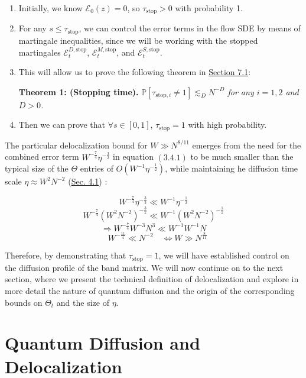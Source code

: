 \documentclass[11pt]{article}
\newenvironment{boxtheorem}[1]
  {\begin{mdframed}\noindent\textbf{#1}\itshape\space}
  {\end{mdframed}}
\newcommand{\E}{\mathcal{E}}
\newcommand{\sto}{\text{stop}}
\begin{document}
  

\begin{enumerate}

\item Initially, we know $\E_0(z) = 0$, so $\tau_{\text{stop}} > 0$ with probability 1.


\item For any $s \leq \tau_{\text{stop}}$, we can control the error terms in the flow SDE by means of martingale inequalities, since we will be working with the stopped martingales $\E_t^{D, \sto}$, $\E_t^{M, \sto}$, and $\E_t^{S, \sto}$. 


\item This will allow us to prove the following theorem in \hyperref[proof-stop]{Section 7.1}:

\begin{boxtheorem}{Theorem 1: (Stopping time).} $\mathbb{P}[\tau_{\text{stop}, i} \neq  1] \lesssim_D N^{-D}$ for any $i=1, 2$ and $D > 0$.
\end{boxtheorem}

\item Then we can prove that $\forall s \in [0,1]$, $\tau_\sto =1$ with high probability. 

\end{enumerate}

\noindent The particular delocalization bound for $W \gg N^{8/11}$ emerges from the need for the combined error term $W^{-\frac{7}{4}}\eta^{-\frac{3}{2}}$ in equation $(3.4.1)$ to be much smaller than the typical size of the $\Theta$ entries of $O( W^{-1}\eta^{-\frac{1}{2}})$, while maintaining he diffusion time scale $\eta \approx W^2N^{-2}$ (\hyperref[diffusion]{Sec. 4.1}) :
	
$$W^{-\frac{7}{4}}\eta^{-\frac{3}{2}} \ll W^{-1}\eta^{-\frac{1}{2}}$$
$$W^{-\frac{7}{4}}(W^2N^{-2})^{-\frac{3}{2}} \ll W^{-1}(W^2N^{-2})^{-\frac{1}{2}}$$
$$\Rightarrow W^{-\frac{7}{4}}W^{-3}N^3 \ll W^{-1}W^{-1}N$$
$$\quad W^{-\frac{11}{4}} \ll N^{-2}\quad\Leftrightarrow W \gg N^{\frac{8}{11}}$$

\noindent Therefore, by demonstrating that $\tau_{\sto}=1$, we will have established control on the diffusion profile of the band matrix. We will now continue on to the next section, where we present the technical definition of delocalization and explore in more detail the nature of quantum diffusion and the origin of the corresponding bounds on $\Theta_t$ and the size of $\eta$. 


\newpage
\section{Quantum Diffusion and Delocalization}
\label{sec:deloc}
\end{document}
